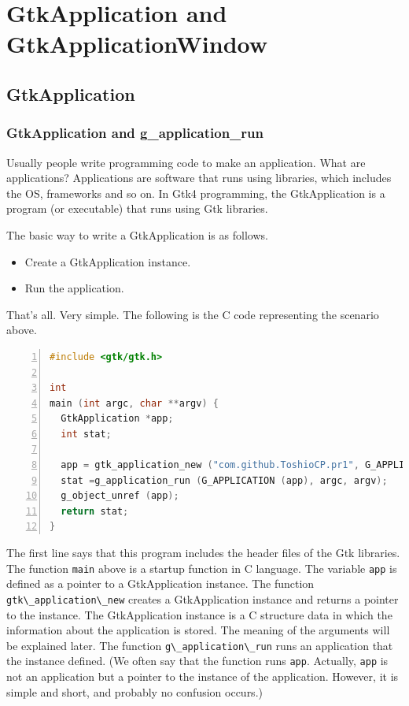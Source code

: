 \hypertarget{gtkapplication-and-gtkapplicationwindow}{%
\section{GtkApplication and
GtkApplicationWindow}\label{gtkapplication-and-gtkapplicationwindow}}

\hypertarget{gtkapplication}{%
\subsection{GtkApplication}\label{gtkapplication}}

\hypertarget{gtkapplication-and-g_application_run}{%
\subsubsection{GtkApplication and
g\_application\_run}\label{gtkapplication-and-g_application_run}}

Usually people write programming code to make an application. What are
applications? Applications are software that runs using libraries, which
includes the OS, frameworks and so on. In Gtk4 programming, the
GtkApplication is a program (or executable) that runs using Gtk
libraries.

The basic way to write a GtkApplication is as follows.

\begin{itemize}
\tightlist
\item
  Create a GtkApplication instance.
\item
  Run the application.
\end{itemize}

That's all. Very simple. The following is the C code representing the
scenario above.

\begin{lstlisting}[language=C, numbers=left]
#include <gtk/gtk.h>

int
main (int argc, char **argv) {
  GtkApplication *app;
  int stat;

  app = gtk_application_new ("com.github.ToshioCP.pr1", G_APPLICATION_FLAGS_NONE);
  stat =g_application_run (G_APPLICATION (app), argc, argv);
  g_object_unref (app);
  return stat;
}
\end{lstlisting}

The first line says that this program includes the header files of the
Gtk libraries. The function \passthrough{\lstinline!main!} above is a
startup function in C language. The variable
\passthrough{\lstinline!app!} is defined as a pointer to a
GtkApplication instance. The function
\passthrough{\lstinline!gtk\_application\_new!} creates a GtkApplication
instance and returns a pointer to the instance. The GtkApplication
instance is a C structure data in which the information about the
application is stored. The meaning of the arguments will be explained
later. The function \passthrough{\lstinline!g\_application\_run!} runs
an application that the instance defined. (We often say that the
function runs \passthrough{\lstinline!app!}. Actually,
\passthrough{\lstinline!app!} is not an application but a pointer to the
instance of the application. However, it is simple and short, and
probably no confusion occurs.)

